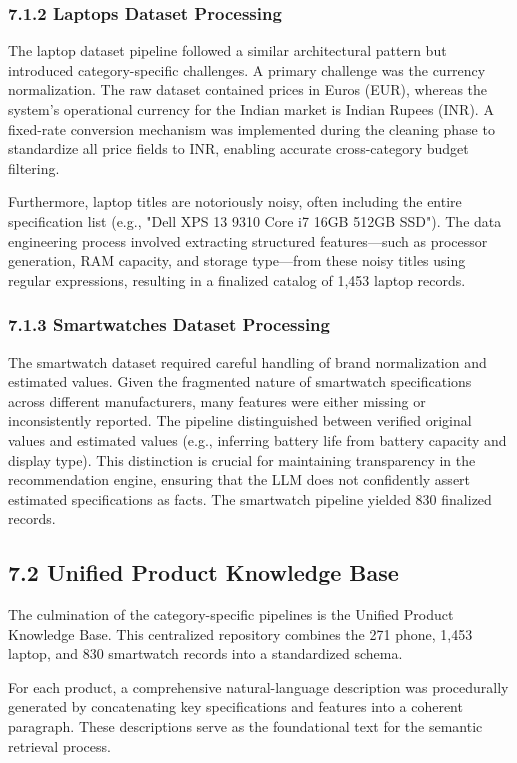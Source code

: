 \subsubsection*{7.1.2 Laptops Dataset Processing}
The laptop dataset pipeline followed a similar architectural pattern but introduced category-specific challenges. A primary challenge was the currency normalization. The raw dataset contained prices in Euros (EUR), whereas the system's operational currency for the Indian market is Indian Rupees (INR). A fixed-rate conversion mechanism was implemented during the cleaning phase to standardize all price fields to INR, enabling accurate cross-category budget filtering. 

Furthermore, laptop titles are notoriously noisy, often including the entire specification list (e.g., "Dell XPS 13 9310 Core i7 16GB 512GB SSD"). The data engineering process involved extracting structured features—such as processor generation, RAM capacity, and storage type—from these noisy titles using regular expressions, resulting in a finalized catalog of 1,453 laptop records.

\subsubsection*{7.1.3 Smartwatches Dataset Processing}
The smartwatch dataset required careful handling of brand normalization and estimated values. Given the fragmented nature of smartwatch specifications across different manufacturers, many features were either missing or inconsistently reported. The pipeline distinguished between verified original values and estimated values (e.g., inferring battery life from battery capacity and display type). This distinction is crucial for maintaining transparency in the recommendation engine, ensuring that the LLM does not confidently assert estimated specifications as facts. The smartwatch pipeline yielded 830 finalized records.

\subsection*{7.2 Unified Product Knowledge Base}
The culmination of the category-specific pipelines is the Unified Product Knowledge Base. This centralized repository combines the 271 phone, 1,453 laptop, and 830 smartwatch records into a standardized schema. 

For each product, a comprehensive natural-language description was procedurally generated by concatenating key specifications and features into a coherent paragraph. These descriptions serve as the foundational text for the semantic retrieval process. 

